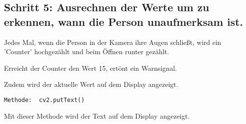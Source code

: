 \subsection*{Schritt 5: Ausrechnen der Werte um zu erkennen, wann die Person unaufmerksam ist.}

Jedes Mal, wenn die Person in der Kamera ihre Augen schließt, wird ein 'Counter' hochgezählt und beim Öffnen runter gezählt. 

Erreicht der Counter den Wert 15, ertönt ein Warnsignal. 

Zudem wird der  aktuelle Wert auf dem Display angezeigt.
\begin{lstlisting}
Methode:  cv2.putText()
\end{lstlisting}

Mit dieser Methode wird der Text auf dem Display angezeigt.\cite{b1}
\newline
\newline

















